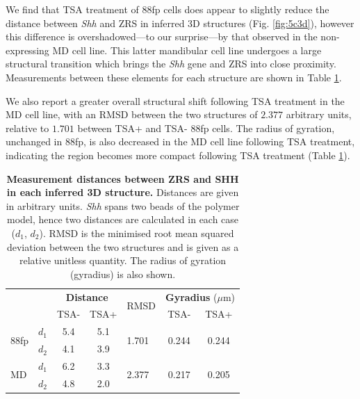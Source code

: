 \documentclass[a4paper,11pt,oneside]{book}
\begin{document}
We find that TSA treatment of 88fp cells does appear to slightly reduce the distance between \emph{Shh} and ZRS in inferred 3D structures (Fig. \ref{fig:5c3d}), however this difference is overshadowed---to our surprise---by that observed in the non-expressing MD cell line. This latter mandibular cell line undergoes a large structural transition which brings the \emph{Shh} gene and ZRS into close proximity. Measurements between these elements for each structure are shown in Table \ref{tab:3ddist}.

We also report a greater overall structural shift following TSA treatment in the MD cell line, with an RMSD between the two structures of $2.377$ arbitrary units, relative to $1.701$ between TSA+ and TSA- 88fp cells. The radius of gyration, unchanged in 88fp, is also decreased in the MD cell line following TSA treatment, indicating the region becomes more compact following TSA treatment (Table \ref{tab:3ddist}).

\begin{table}[]
\centering
\caption[Measurement distances between ZRS and SHH in each inferred 3D structure.]{ {\bf Measurement distances between ZRS and SHH in each inferred 3D structure. }
Distances are given in arbitrary units. \emph{Shh} spans two beads of the polymer model, hence two distances are calculated in each case ($d_1$, $d_2$). RMSD is the minimised root mean squared deviation between the two structures and is given as a relative unitless quantity. The radius of gyration (gyradius) is also shown.
}
\label{tab:3ddist}
\begin{tabular}{ll|cc|l|cc|}
                      &    & \multicolumn{2}{c|}{{\bf Distance}} & \multirow{2}{*}{RMSD}   & \multicolumn{2}{c|}{{\bf Gyradius } ($\mu$m)}             \\
                      &    & TSA-             & TSA+             &                        & TSA-                   & TSA+                   \\ \hline
\multirow{2}{*}{88fp} & $d_1$ & 5.4              & 5.1              & \multirow{2}{*}{1.701} & \multirow{2}{*}{0.244} & \multirow{2}{*}{0.244} \\
                      & $d_2$ & 4.1              & 3.9              &                        &                        &                        \\ \hline
\multirow{2}{*}{MD}   & $d_1$ & 6.2              & 3.3              & \multirow{2}{*}{2.377} & \multirow{2}{*}{0.217} & \multirow{2}{*}{0.205} \\
                      & $d_2$ & 4.8              & 2.0              &                        &                        &                        \\ \hline
\end{tabular}
\end{table}
\end{document}
